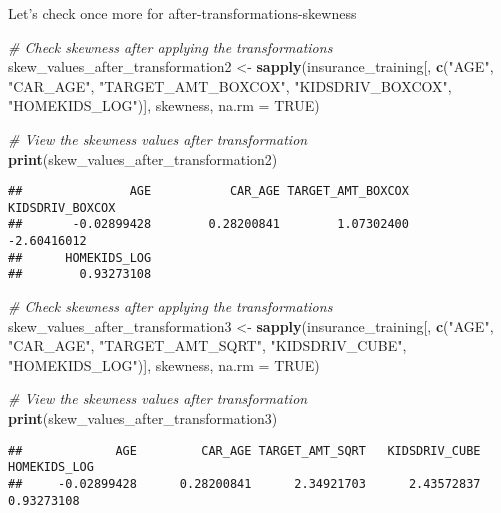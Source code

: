 \documentclass[
]{article}
\newenvironment{Shaded}{\begin{snugshade}}{\end{snugshade}}
\newcommand{\AttributeTok}[1]{\textcolor[rgb]{0.13,0.29,0.53}{#1}}
\newcommand{\CommentTok}[1]{\textcolor[rgb]{0.56,0.35,0.01}{\textit{#1}}}
\newcommand{\ConstantTok}[1]{\textcolor[rgb]{0.56,0.35,0.01}{#1}}
\newcommand{\FunctionTok}[1]{\textcolor[rgb]{0.13,0.29,0.53}{\textbf{#1}}}
\newcommand{\NormalTok}[1]{#1}
\newcommand{\OtherTok}[1]{\textcolor[rgb]{0.56,0.35,0.01}{#1}}
\newcommand{\StringTok}[1]{\textcolor[rgb]{0.31,0.60,0.02}{#1}}
\begin{document}
Let's check once more for after-transformations-skewness

\begin{Shaded}
\begin{Highlighting}[]
\CommentTok{\# Check skewness after applying the transformations}
\NormalTok{skew\_values\_after\_transformation2 }\OtherTok{\textless{}{-}} \FunctionTok{sapply}\NormalTok{(insurance\_training[, }\FunctionTok{c}\NormalTok{(}\StringTok{"AGE"}\NormalTok{, }\StringTok{"CAR\_AGE"}\NormalTok{, }\StringTok{"TARGET\_AMT\_BOXCOX"}\NormalTok{, }\StringTok{"KIDSDRIV\_BOXCOX"}\NormalTok{, }\StringTok{"HOMEKIDS\_LOG"}\NormalTok{)], skewness, }\AttributeTok{na.rm =} \ConstantTok{TRUE}\NormalTok{)}

\CommentTok{\# View the skewness values after transformation}
\FunctionTok{print}\NormalTok{(skew\_values\_after\_transformation2)}
\end{Highlighting}
\end{Shaded}

\begin{verbatim}
##               AGE           CAR_AGE TARGET_AMT_BOXCOX   KIDSDRIV_BOXCOX 
##       -0.02899428        0.28200841        1.07302400       -2.60416012 
##      HOMEKIDS_LOG 
##        0.93273108
\end{verbatim}

\begin{Shaded}
\begin{Highlighting}[]
\CommentTok{\# Check skewness after applying the transformations}
\NormalTok{skew\_values\_after\_transformation3 }\OtherTok{\textless{}{-}} \FunctionTok{sapply}\NormalTok{(insurance\_training[, }\FunctionTok{c}\NormalTok{(}\StringTok{"AGE"}\NormalTok{, }\StringTok{"CAR\_AGE"}\NormalTok{, }\StringTok{"TARGET\_AMT\_SQRT"}\NormalTok{, }\StringTok{"KIDSDRIV\_CUBE"}\NormalTok{, }\StringTok{"HOMEKIDS\_LOG"}\NormalTok{)], skewness, }\AttributeTok{na.rm =} \ConstantTok{TRUE}\NormalTok{)}

\CommentTok{\# View the skewness values after transformation}
\FunctionTok{print}\NormalTok{(skew\_values\_after\_transformation3)}
\end{Highlighting}
\end{Shaded}

\begin{verbatim}
##             AGE         CAR_AGE TARGET_AMT_SQRT   KIDSDRIV_CUBE    HOMEKIDS_LOG 
##     -0.02899428      0.28200841      2.34921703      2.43572837      0.93273108
\end{verbatim}
\end{document}
